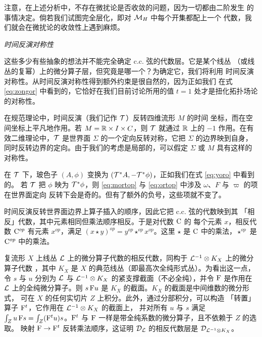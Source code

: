 注意，在上述分析中，不存在微扰论是否收敛的问题，因为一切都由二阶发生
的事情决定。倘若我们试图完全层化，即对 $\MH$ 中每个开集都配上一个
代数，我们就会在微扰论的收敛性上遇到麻烦。

\par\medskip\emph{时间反演对称性}

这些多少有些抽象的想法并不能完全确定 c.c. 弦的代数层。它是某个线丛
（或线丛的复幂）上的微分算子层，但究竟是哪一个？为确定它，我们将利用
时间反演对称性。从时间反演对称性得到额外约束是很自然的，因为正如我们
在式 \eqref{eq:zongor} 中看到的，它恰好在我们目前讨论所用的值 $t=1$
处才是扭化拓扑场论的对称性。

在规范理论中，时间反演（我们记作 ${\EUT}$）反转四维流形 $M$ 的时间
坐标，而在空间坐标上平凡地作用。若 $M=\Bbb{R}\times I\times C$，则
${\EUT}$ 就通过 $\Bbb{R}$ 上的 $-1$ 作用。在有效二维理论中，${\EUT}$
是世界面 $\Sigma$ 的一个定向反转对称，它把 $\Sigma$ 的边界映到自身，
同时反转边界的定向。由于我们的考虑是局部的，可以假定 $\Sigma$ 或 $M$
具有这样的对称性。

在 ${\EUT}$ 下，玻色子 $(A,\phi)$ 变换为
$({\EUT}^*A,-{\EUT}^*\phi)$，正如我们在式 \eqref{eq:yoro} 中看到的。
若 ${\EUT}$ 把 $\phi$ 映为 ${\EUT}^*\phi$，则 \eqref{eq:mortop} 与
\eqref{eq:ortop} 中涉及 $\omega$、$F$ 与 $\varpi$ 的项在世界面定向
反转下会是奇的。但有了额外的负号，这些项就不变了。

时间反演反转世界面边界上算子插入的顺序，因此它把 c.c. 弦的代数映到其
「相反」代数，其中元素相同但乘法顺序相反。于是对代数 ${\eurm C}$ 的
每个元素 $x$，相反代数 ${\eurm C}^{op}$ 有元素 $x^{op}$，满足
$(x\star y)^{op}=y^{op}\star^{op} x^{op}$。这里 $\star$ 是
${\eurm C}$ 中的乘法，$\star^{op}$ 是 ${\eurm C}^{op}$ 中的乘法。

复流形 $X$ 上线丛 $\cL$ 上的微分算子代数的相反代数，同构于
$\cL^{-1}\otimes K_X$ 上的微分算子代数 \cite{ref140}，其中 $K_X$ 是
$X$ 的典范线丛（即最高次全纯形式丛）。为看出这一点，令 $s$ 与 $u$
分别为 $\cL$ 与 $\cL^{-1}\otimes K_X$ 的紧支撑截面（不必全纯），并令
${\eurm F}$ 是作用在 $\cL$ 上的全纯微分算子。则
$s\, {{\eurm F}}u$ 是 $K_X$ 的截面。$K_X$ 的截面是中间维数的微分形式，
可在 $X$ 的任何实切片 $Z$ 上积分。此外，通过分部积分，可以构造
「转置」算子 ${{\eurm F}}^t$，它作用在 $\cL^{-1}\otimes K_X$ 的截面上，
并对所有 $u$ 与 $s$ 满足
$\int_Z u\,{{\eurm F}} s=\int_Z ({\eurm F}^t u)s$。${{\eurm F}}^t$ 与
${{\eurm F}}$ 一样是带全纯系数的微分算子，且不依赖于 $Z$ 的选取。
映射 ${{\eurm F}}\to {{\eurm F}}^t$ 反转乘法顺序，这证明
${\cal D}_{\cal L}$ 的相反代数层是
${\cal D}_{{\cal L}^{-1}\otimes K_X}$。

